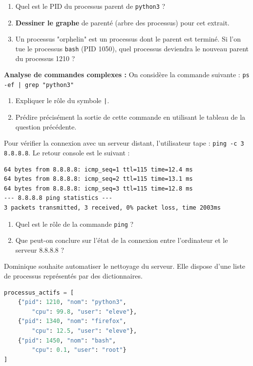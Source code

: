 \begin{Exercise}[title={Systèmes d'exploitation, gestion des fichiers et des processus}]
\begin{enumerate}
    \item Quel est le PID du processus parent de \texttt{python3} ?
    \item \textbf{Dessiner le graphe} de parenté (arbre des processus) pour cet extrait.
    \item Un processus "orphelin" est un processus dont le parent est terminé. Si l'on tue le processus \texttt{bash} (PID 1050), quel processus deviendra le nouveau parent du processus 1210 ?
\end{enumerate}

\Question \textbf{Analyse de commandes complexes :}
On considère la commande suivante : \texttt{ps -ef | grep "python3"}
\begin{enumerate}
    \item Expliquer le rôle du symbole \texttt{|}.
    \item Prédire précisément la sortie de cette commande en utilisant le tableau de la question précédente.
\end{enumerate}


\Question Pour vérifier la connexion avec un serveur distant, l'utilisateur tape : \texttt{ping -c 3 8.8.8.8}.
Le retour console est le suivant :
\begin{lstlisting}
64 bytes from 8.8.8.8: icmp_seq=1 ttl=115 time=12.4 ms
64 bytes from 8.8.8.8: icmp_seq=2 ttl=115 time=13.1 ms
64 bytes from 8.8.8.8: icmp_seq=3 ttl=115 time=12.8 ms
--- 8.8.8.8 ping statistics ---
3 packets transmitted, 3 received, 0% packet loss, time 2003ms
\end{lstlisting}
\begin{enumerate}
    \item Quel est le rôle de la commande \texttt{ping} ?
    \item Que peut-on conclure sur l'état de la connexion entre l'ordinateur et le serveur 8.8.8.8 ?
\end{enumerate}


\Question Dominique souhaite automatiser le nettoyage du serveur. Elle dispose d'une liste de processus représentés par des dictionnaires.

\begin{lstlisting}[language=Python]
processus_actifs = [
    {"pid": 1210, "nom": "python3",
        "cpu": 99.8, "user": "eleve"},
    {"pid": 1340, "nom": "firefox",
        "cpu": 12.5, "user": "eleve"},
    {"pid": 1450, "nom": "bash",
        "cpu": 0.1, "user": "root"}
]
\end{lstlisting}


\end{Exercise}
